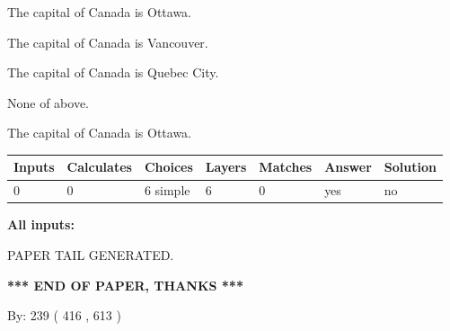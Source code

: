 \documentclass[12pt]{article}
\begin{document}
 
The capital of Canada is Ottawa.
 
 
The capital of Canada is Vancouver.
 
 
The capital of Canada is Quebec City.
 
 
 None of above.
 
 
\noindent{}
 
 
The capital of Canada is Ottawa.
 
 
\noindent{}
 
 
   
   
   
   
\noindent\begin{tabular}{|l|l|l|l|l|l|l|}
 \hline
Inputs & Calculates & Choices & Layers & Matches & Answer & Solution \\ \hline
 0  & 
 0  & 
 6
  simple  
  & 
 6  & 
 0  & 
  yes & 
  no 
  \\ \hline
 \end{tabular}
   
   
   
   
\noindent{}
   
   
   
   
\noindent\vspace{0.1in}\hspace{-0.08in} {\textbf{\Large{All inputs: }}}
   
   
   
   
   
   
 \vspace{0.2in}
 
   
   
\vspace{2.0in} PAPER TAIL GENERATED.
   
   
   
   
\vspace{1.0in} 
{\textbf{\large{ *** END OF PAPER, THANKS *** }}} 
   
   
\hspace{1.0in} By: 
 239 ( 416 ,  613 )
   
   
   
   
\newpage 
\setcounter{page}{ 
   435001 } 
   
\end{document}
